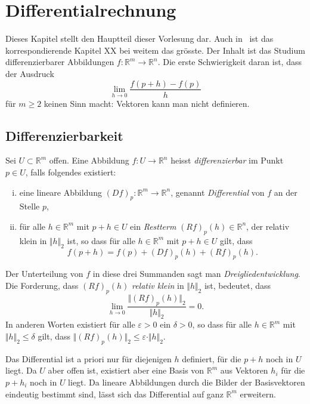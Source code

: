 \documentclass[../main.tex]{subfiles}
\begin{document}
\chapter{Differentialrechnung}\label{chp:differential}
Dieses Kapitel stellt den Hauptteil dieser Vorlesung dar.
Auch in~\cite{heuser} ist das korrespondierende
Kapitel XX bei weitem das grösste. Der Inhalt ist das
Studium differenzierbarer Abbildungen 
$f \colon \mathbb{R}^m \to \mathbb{R}^n$.
Die erste Schwierigkeit daran ist, dass der Ausdruck
\[
  \lim_{h \to 0} \frac{f(p + h) - f(p)}{h}
\]
für $m \geq 2$ keinen Sinn macht: Vektoren kann man nicht
definieren.

\section{Differenzierbarkeit}
\begin{definition}
  Sei $U \subset \mathbb{R}^m$ offen. Eine Abbildung
  $f \colon U \to \mathbb{R}^n$ heisst
  \emph{differenzierbar} im Punkt $p \in U$, falls
  folgendes existiert:
  \begin{enumerate}[(i)]
    \item eine lineare Abbildung 
      ${(Df)}_p \colon \mathbb{R}^m \to \mathbb{R}^n$,
      genannt \emph{Differential} von $f$ an
      der Stelle $p$,
    \item für alle $h \in \mathbb{R}^m$ mit $p + h \in U$ 
      ein \emph{Restterm} ${(Rf)}_p(h) \in \mathbb{R}^n$,
      der relativ klein in $\Vert h \Vert_2$ ist,
      so dass für alle $h \in \mathbb{R}^m$ mit $p + h \in U$ 
      gilt, dass
      \[
        f(p+h) = f(p) + {(Df)}_p(h) + {(Rf)}_p(h).
      \]
  \end{enumerate}
  Der Unterteilung von $f$ in diese drei Summanden sagt man
  \emph{Dreigliedentwicklung}. Die Forderung,
  dass ${(Rf)}_p(h)$ \emph{relativ klein} in $\Vert h \Vert_2$ 
  ist, bedeutet, dass
  \[
    \lim_{h \to 0} \frac{\Vert {(Rf)}_p(h)\Vert_2}{\Vert h \Vert_2}
    = 0.
  \]
  In anderen Worten existiert für alle $\varepsilon > 0$ ein $\delta > 0 $,
  so dass für alle $h \in \mathbb{R}^m$ mit $\Vert h \Vert_2
  \leq \delta$ gilt, dass $\Vert {(Rf)}_p(h) \Vert_2
  \leq \varepsilon \cdot \Vert h \Vert_2$.
\end{definition}

\begin{remark}
  Das Differential ist a priori nur für diejenigen
  $h$ definiert, für die $p + h$ noch in $U$ 
  liegt. Da $U$ aber offen ist, existiert aber
  eine Basis von $\mathbb{R}^m$ aus Vektoren
  $h_i$ für die $p + h_i$ noch in $U$ liegt.
  Da lineare Abbildungen durch die Bilder der
  Basisvektoren eindeutig bestimmt sind, lässt
  sich das Differential auf ganz $\mathbb{R}^m$
  erweitern.
\end{remark}
\end{document}
